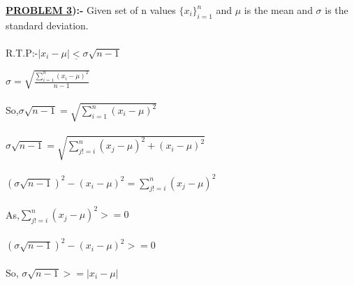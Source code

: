 \documentclass[a4paper]{article}
\begin{document}
\begin{flushleft}
\Large{\textbf{\underline{PROBLEM 3}):-}}
\Large{
Given set of n values ${\{x_i\}_{i=1}^n}$ and $\mu$ is the mean and $\sigma$ is the standard deviation.\\ \ \\
R.T.P:-$|x_i-\mu|\underline{<}\sigma\sqrt{n-1}$\\
}
\begin{center}
$\sigma = \sqrt{\frac{\sum_{i=1}^n (x_i-\mu)^2}{n-1}}$\\ \ \\
So,$\sigma\sqrt{n-1}=\sqrt{\sum_{i=1}^n (x_i-\mu)^2}$ \\ \ \\
$\sigma\sqrt{n-1}=\sqrt{{\sum_{j!=i}^n (x_j-\mu)^2}+(x_i-\mu)^2}$\\ \ \\
$(\sigma\sqrt{n-1})^2-(x_i-\mu)^2={\sum_{j!=i}^n (x_j-\mu)^2}$\\ \ \\
As,${\sum_{j!=i}^n (x_j-\mu)^2} >= 0$\\ \ \\
$(\sigma\sqrt{n-1})^2-(x_i-\mu)^2 >= 0$\\ \ \\
So, $\sigma\sqrt{n-1} >= |x_i-\mu|$\\ \ \\
\end{center}
\end{flushleft}
\newpage
\end{document}
